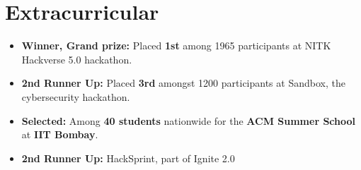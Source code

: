 \documentclass[letterpaper,11pt]{article}
\makeatletter
\newcommand{\resumeItem}[1]{
  \item\small{
    {#1 \vspace{-2pt}}
  }
}
\newcommand{\resumeProjectHeading}[2]{
    \item
    \begin{tabular*}{0.97\textwidth}{l@{\extracolsep{\fill}}r}
      \small#1 & #2 \\
    \end{tabular*}\vspace{-7pt}
}
\newcommand{\resumeSubHeadingListEnd}{\end{itemize}}
\newcommand{\resumeItemListStart}{\begin{itemize}}
\newcommand{\resumeItemListEnd}{\end{itemize}\vspace{-5pt}}
\makeatother
\begin{document}





\section{Extracurricular} \vspace{0.5pt}
\begin{itemize}[leftmargin=0.15in, label={}, itemsep=0.08em, topsep=1pt]
    \item \textbf{Winner, Grand prize:} Placed \textbf{1st} among 1965 participants at NITK Hackverse 5.0 hackathon.
    \item \textbf{2nd Runner Up:} Placed \textbf{3rd} amongst 1200 participants at Sandbox, the cybersecurity hackathon. 
    \item \textbf{Selected:} Among \textbf{40 students} nationwide for the \textbf{ACM  Summer School} at \textbf{IIT Bombay}.
    \item \textbf{2nd Runner Up:} HackSprint, part of Ignite 2.0
\end{itemize}
\end{document}
